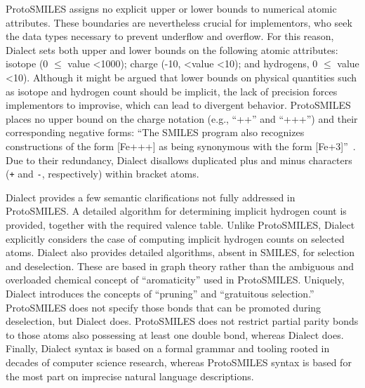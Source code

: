 \documentclass{article}
\def\ttt{\texttt}
\begin{document}
ProtoSMILES assigns no explicit upper or lower bounds to numerical atomic attributes. These boundaries are nevertheless crucial for implementors, who seek the data types necessary to prevent underflow and overflow. For this reason, Dialect sets both upper and lower bounds on the following atomic attributes: isotope (0 $\leq$ value \textless 1000); charge (-10, \textless value \textless 10); and hydrogens, 0 $\leq$ value \textless 10). Although it might be argued that lower bounds on physical quantities such as isotope and hydrogen count should be implicit, the lack of precision forces implementors to improvise, which can lead to divergent behavior. ProtoSMILES places no upper bound on the charge notation (e.g., \enquote{++} and \enquote{+++}) and their corresponding negative forms: \enquote{The SMILES program also recognizes constructions of the form [Fe+++] as being synonymous with the form [Fe+3]}~\cite[p.~32]{weininger:1988}. Due to their redundancy, Dialect disallows duplicated plus and minus characters (\ttt{+} and \ttt{-}, respectively) within bracket atoms.

Dialect provides a few semantic clarifications not fully addressed in ProtoSMILES. A detailed algorithm for determining implicit hydrogen count is provided, together with the required valence table. Unlike ProtoSMILES, Dialect explicitly considers the case of computing implicit hydrogen counts on selected atoms. Dialect also provides detailed algorithms, absent in SMILES, for selection and deselection. These are based in graph theory rather than the ambiguous and overloaded chemical concept of \enquote{aromaticity} used in ProtoSMILES. Uniquely, Dialect introduces the concepts of \enquote{pruning} and \enquote{gratuitous selection.} ProtoSMILES does not specify those bonds that can be promoted during deselection, but Dialect does. ProtoSMILES does not restrict partial parity bonds to those atoms also possessing at least one double bond, whereas Dialect does. Finally, Dialect syntax is based on a formal grammar and tooling rooted in decades of computer science research, whereas ProtoSMILES syntax is based for the most part on imprecise natural language descriptions.
\end{document}

